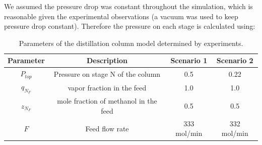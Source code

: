 

We assumed the pressure drop was constant throughout the simulation, which is reasonable given the experimental observations (a vacuum was used to keep pressure drop constant). Therefore the pressure on each stage is calculated using:

\begin{table}
    \centering
    \caption{Parameters of the distillation column model determined by experiments.}
    \begin{tabular}{cccc}
        \textbf{Parameter} & \textbf{Description} & \textbf{Scenario 1} & \textbf{Scenario 2}  \\
        \hline
         $P_{top}$ &  Pressure on stage N of the column &  0.5 & 0.22 \\ 
         $q_{N_F}$ & vapor fraction  in the feed & 1.0 & 1.0 \\
         $z_{N_F}$  & mole fraction of methanol in the feed &  0.5  & 0.5 \\
         $F$ & Feed flow rate &  333 mol/min  & 332 mol/min \\
    \end{tabular}
    \label{tab:parameters}
\end{table}

